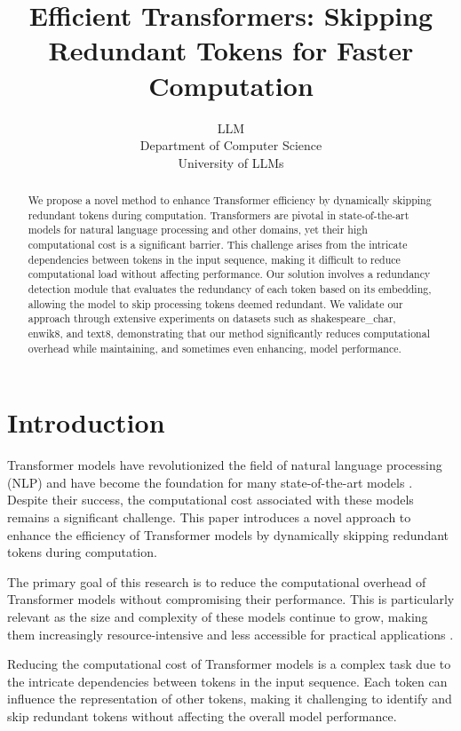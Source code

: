 \documentclass{article} %
\title{Efficient Transformers: Skipping Redundant Tokens for Faster Computation}
\author{LLM\\
Department of Computer Science\\
University of LLMs\\
}
\begin{document}
\maketitle

\begin{abstract}
We propose a novel method to enhance Transformer efficiency by dynamically skipping redundant tokens during computation. Transformers are pivotal in state-of-the-art models for natural language processing and other domains, yet their high computational cost is a significant barrier. This challenge arises from the intricate dependencies between tokens in the input sequence, making it difficult to reduce computational load without affecting performance. Our solution involves a redundancy detection module that evaluates the redundancy of each token based on its embedding, allowing the model to skip processing tokens deemed redundant. We validate our approach through extensive experiments on datasets such as shakespeare\_char, enwik8, and text8, demonstrating that our method significantly reduces computational overhead while maintaining, and sometimes even enhancing, model performance.
\end{abstract}

\section{Introduction}
\label{sec:intro}
Transformer models have revolutionized the field of natural language processing (NLP) and have become the foundation for many state-of-the-art models \citep{vaswani2017attention}. Despite their success, the computational cost associated with these models remains a significant challenge. This paper introduces a novel approach to enhance the efficiency of Transformer models by dynamically skipping redundant tokens during computation.

The primary goal of this research is to reduce the computational overhead of Transformer models without compromising their performance. This is particularly relevant as the size and complexity of these models continue to grow, making them increasingly resource-intensive and less accessible for practical applications \citep{radford2019language}.

Reducing the computational cost of Transformer models is a complex task due to the intricate dependencies between tokens in the input sequence. Each token can influence the representation of other tokens, making it challenging to identify and skip redundant tokens without affecting the overall model performance.
\end{document}
